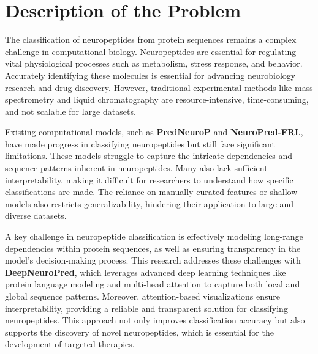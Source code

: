 \documentclass[conference]{IEEEtran}
\begin{document}
\section{Description of the Problem}

The classification of neuropeptides from protein sequences remains a complex challenge in computational biology. Neuropeptides are essential for regulating vital physiological processes such as metabolism, stress response, and behavior. Accurately identifying these molecules is essential for advancing neurobiology research and drug discovery. However, traditional experimental methods like mass spectrometry and liquid chromatography are resource-intensive, time-consuming, and not scalable for large datasets.

Existing computational models, such as \textbf{PredNeuroP} and \textbf{NeuroPred-FRL}, have made progress in classifying neuropeptides but still face significant limitations. These models struggle to capture the intricate dependencies and sequence patterns inherent in neuropeptides. Many also lack sufficient interpretability, making it difficult for researchers to understand how specific classifications are made. The reliance on manually curated features or shallow models also restricts generalizability, hindering their application to large and diverse datasets.

A key challenge in neuropeptide classification is effectively modeling long-range dependencies within protein sequences, as well as ensuring transparency in the model's decision-making process. This research addresses these challenges with \textbf{DeepNeuroPred}, which leverages advanced deep learning techniques like protein language modeling and multi-head attention to capture both local and global sequence patterns. Moreover, attention-based visualizations ensure interpretability, providing a reliable and transparent solution for classifying neuropeptides. This approach not only improves classification accuracy but also supports the discovery of novel neuropeptides, which is essential for the development of targeted therapies.
\end{document}

